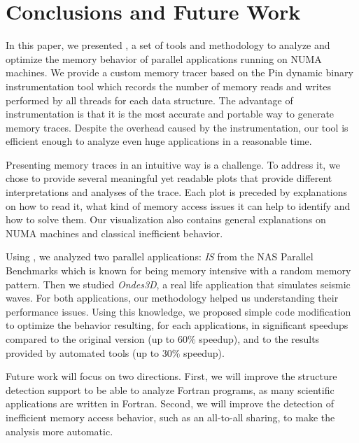 
\section{Conclusions and Future Work}
\label{sec:concl}

In this paper, we presented \TABARNAC, a set of tools and methodology to analyze and
optimize the memory behavior of parallel applications running on NUMA
machines. We provide a custom memory tracer
based on the Pin dynamic binary instrumentation tool which records the
number of memory reads and writes performed by all threads for each data structure.
The advantage of instrumentation is that it is the most
accurate and portable way to generate memory traces.
Despite the overhead caused by the instrumentation, our tool is efficient enough to analyze even huge applications in a reasonable time.

Presenting memory traces in an intuitive way is a challenge. To address it, we
chose to provide several meaningful yet readable plots that provide different
interpretations and analyses of the trace. Each plot is preceded by
explanations on how to read it, what kind of memory access issues it can help
to identify and how to solve them.  Our visualization also contains general
explanations on NUMA machines and classical inefficient behavior.

Using \TABARNAC, we analyzed two parallel applications: \emph{IS} from the NAS
Parallel Benchmarks which is known for being memory intensive with a random
memory pattern. Then we studied \emph{Ondes3D}, a real life application that
simulates seismic waves. For both applications, our methodology helped us
understanding their performance issues.  Using this knowledge, we proposed
simple code modification to optimize the behavior resulting, for each
applications, in significant speedups compared to the original version (up to
$60\%$ speedup), and to the results provided by automated tools (up to $30\%$
speedup).

Future work will focus on two directions. First, we will improve the
structure detection support to be able to analyze Fortran programs, as many
scientific applications are written in Fortran. Second, we will improve the
detection of inefficient memory access behavior, such as an all-to-all
sharing, to make the analysis more automatic.
